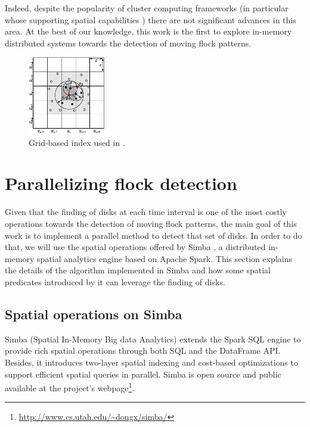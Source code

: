 \documentclass[12pt]{scrartcl}
\begin{document}
Indeed, despite the popularity of cluster computing frameworks (in particular whose supporting spatial capabilities \citep{eldawy_spatialhadoop:_2014, yu_demonstration_2016, pellechia_geomesa:_2015, xie_simba:_2016}) there are not significant advances in this area.  At the best of our knowledge, this work is the first to explore in-memory distributed systems towards the detection of moving flock patterns.

\begin{figure}
 \centering
 \includegraphics[width=0.3\textwidth]{./figures/grid}
 \caption{Grid-based index used in \cite{vieira_-line_2009}.}
 \label{fig:grid}
\end{figure}

\section{Parallelizing flock detection}\label{sec:flock}
% 

Given that the finding of disks at each time interval is one of the most costly operations towards the detection of moving flock patterns, the main goal of this work is to implement a parallel method to detect that set of disks.  In order to do that, we will use the spatial operations offered by Simba \citep{xie_simba:_2016}, a distributed in-memory spatial analytics engine based on Apache Spark. This section explains the details of the algorithm implemented in Simba and how some spatial predicates introduced by it can leverage the finding of disks.

\subsection{Spatial operations on Simba}
Simba (Spatial In-Memory Big data Analytics) extends the Spark SQL engine to provide rich spatial operations through both SQL and the DataFrame API.  Besides, it introduces two-layer spatial indexing and cost-based optimizations to support efficient spatial queries in parallel.  Simba is open source and public available at the project's webpage\footnote{\url{http://www.cs.utah.edu/~dongx/simba/}}.
\end{document}
